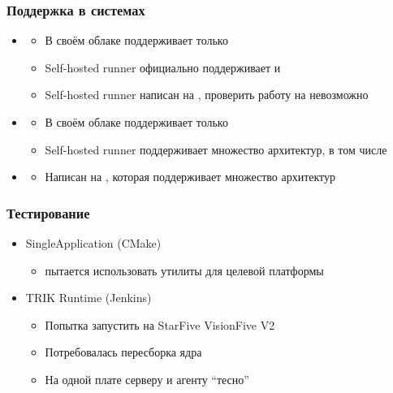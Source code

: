 \documentclass[aspectratio=169]{beamer}
\begin{document}
\begin{frame}
	\frametitle{Поддержка в \ci{} системах}

	\begin{itemize}
		\item \GitHub{}
		      \begin{itemize}
			      \item В своём облаке поддерживает только \amd{}
			      \item Self-hosted runner официально поддерживает \amd{} и \arm{}
			      \item Self-hosted runner написан на \dotnet{}, проверить работу на \riscv{} невозможно
		      \end{itemize}
		\item \gitlab{}
		      \begin{itemize}
			      \item В своём облаке поддерживает только \amd{}
			      \item Self-hosted runner поддерживает множество архитектур, в том числе \riscv{}
		      \end{itemize}
		\item \jenkins{}
		      \begin{itemize}
			      \item Написан на \java{}, которая поддерживает множество архитектур
		      \end{itemize}
	\end{itemize}
\end{frame}

\begin{frame}
	\frametitle{Тестирование}

	\begin{itemize}
		\item SingleApplication (CMake)
		      \begin{itemize}
			      \item \cmake{} пытается использовать утилиты \qt{} для целевой платформы
		      \end{itemize}
		\item TRIK Runtime (Jenkins)
		      \begin{itemize}
			      \item Попытка запустить на StarFive VisionFive V2
			      \item Потребовалась пересборка ядра
			      \item На одной плате серверу и агенту \enquote{тесно}
		      \end{itemize}
	\end{itemize}

\end{frame}
\end{document}
